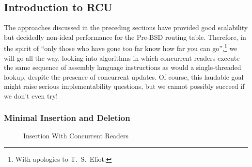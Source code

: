
\subsection{Introduction to RCU}
\label{sec:defer:Introduction to RCU}

The approaches discussed in the preceding sections have provided
good scalability but decidedly non-ideal performance for the
Pre-BSD routing table.
Therefore, in the spirit of ``only those who have gone too far
know how far you can go'',\footnote{
	With apologies to T.~S.~Eliot.}
we will go all the way, looking into algorithms in which concurrent
readers execute the same sequence of assembly language instructions as
would a single-threaded lookup, despite the presence of concurrent
updates.
Of course, this laudable goal might raise serious implementability
questions, but we cannot possibly succeed if we don't even try!

\subsubsection{Minimal Insertion and Deletion}
\label{sec:defer:Minimal Insertion and Deletion}

\begin{figure}[tb]
\centering
{}
\caption{Insertion With Concurrent Readers}
\label{fig:defer:Insertion With Concurrent Readers}
\end{figure}

